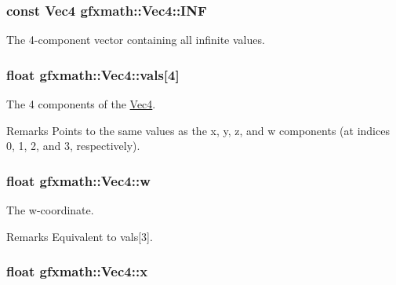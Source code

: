 \subsubsection[{I\+N\+F}]{\setlength{\rightskip}{0pt plus 5cm}const {\bf Vec4} gfxmath\+::\+Vec4\+::\+I\+N\+F\hspace{0.3cm}{\ttfamily [static]}}\label{classgfxmath_1_1_vec4_a38e1933d9d6d5dd565a424a0a049f92e}


The 4-\/component vector containing all infinite values. 

\hypertarget{classgfxmath_1_1_vec4_aa668d284af0138ed1d09663fb0bd3d6f}{}
\subsubsection[{vals}]{\setlength{\rightskip}{0pt plus 5cm}float gfxmath\+::\+Vec4\+::vals\mbox{[}4\mbox{]}}\label{classgfxmath_1_1_vec4_aa668d284af0138ed1d09663fb0bd3d6f}


The 4 components of the \hyperlink{classgfxmath_1_1_vec4}{Vec4}. 

\begin{DoxyRemark}{Remarks}
Points to the same values as the x, y, z, and w components (at indices 0, 1, 2, and 3, respectively). 
\end{DoxyRemark}
\hypertarget{classgfxmath_1_1_vec4_adf2769a47b464dfee8d04e191f21701e}{}
\subsubsection[{w}]{\setlength{\rightskip}{0pt plus 5cm}float gfxmath\+::\+Vec4\+::w}\label{classgfxmath_1_1_vec4_adf2769a47b464dfee8d04e191f21701e}


The w-\/coordinate. 

\begin{DoxyRemark}{Remarks}
Equivalent to vals\mbox{[}3\mbox{]}. 
\end{DoxyRemark}
\hypertarget{classgfxmath_1_1_vec4_a273598aff75406f0e7a47121b8b06037}{}
\subsubsection[{x}]{\setlength{\rightskip}{0pt plus 5cm}float gfxmath\+::\+Vec4\+::x}\label{classgfxmath_1_1_vec4_a273598aff75406f0e7a47121b8b06037}


